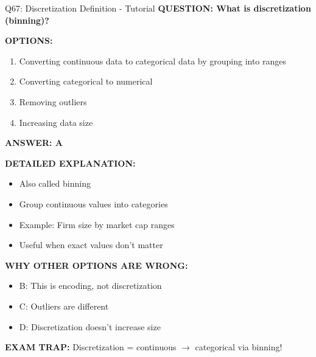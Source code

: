 \documentclass[8pt]{beamer}
\begin{document}
	\begin{frame}{Q67: Discretization Definition - Tutorial}
		\fontsize{6.5}{7.5}\selectfont
		\textbf{QUESTION: What is discretization (binning)?}
		
		\vspace{0.1cm}
		\textbf{OPTIONS:}
		\begin{enumerate}
			\item Converting continuous data to categorical data by grouping into ranges
			\item Converting categorical to numerical
			\item Removing outliers
			\item Increasing data size
		\end{enumerate}
		
		\vspace{0.1cm}
		\textcolor{myblue}{\textbf{ANSWER: A}}
		
		\vspace{0.1cm}
		\textbf{DETAILED EXPLANATION:}
		\begin{itemize}
			\item Also called binning
			\item Group continuous values into categories
			\item Example: Firm size by market cap ranges
			\item Useful when exact values don't matter
		\end{itemize}
		
		\vspace{0.1cm}
		\textcolor{myred}{\textbf{WHY OTHER OPTIONS ARE WRONG:}}
		\begin{itemize}
			\item \textcolor{myred}{B:} This is encoding, not discretization
			\item \textcolor{myred}{C:} Outliers are different
			\item \textcolor{myred}{D:} Discretization doesn't increase size
		\end{itemize}
		
		\textcolor{myred}{\textbf{EXAM TRAP:}} Discretization = \textcolor{myblue}{continuous $\to$ categorical via binning}!
	\end{frame}
	
\end{document}
